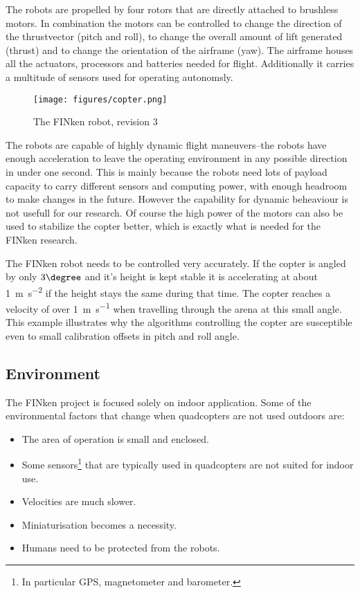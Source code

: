 The robots are propelled by four rotors that are directly attached to brushless motors.
In combination the motors can be controlled to change the direction of the thrustvector (pitch and roll), to change the overall amount of lift generated (thrust) and to change the orientation of the airframe (yaw).
The airframe houses all the actuators, processors and batteries needed for flight.
Additionally it carries a multitude of sensors used for operating autonomsly.

\begin{figure}[H]
	\centering
\texttt{[image: figures/copter.png]}
\label{copterfoto}
\caption{The FINken robot, revision 3}
\end{figure}

The robots are capable of highly dynamic flight maneuvers–the robots have enough acceleration to leave the operating environment in any possible direction in under one second.
This is mainly because the robots need lots of payload capacity to carry different sensors and computing power, with enough headroom to make changes in the future.
However the capability for dynamic beheaviour is not usefull for our research.
Of course the high power of the motors can also be used to stabilize the copter better, which is exactly what is needed for the FINken research.

The FINken robot needs to be controlled very accurately.
If the copter is angled by only $3\degree$ and it's height is kept stable it is accelerating at about \SI{1}{\metre\per\square\second} if the height stays the same during that time.
The copter reaches a velocity of over \SI{1}{\metre\per\second} when travelling through the arena at this small angle.
This example illustrates why the algorithms controlling the copter are susceptible even to small calibration offsets in pitch and roll angle.

\subsection{Environment}
\label{env}
The FINken project is focused solely on indoor application.
Some of the environmental factors that change when quadcopters are not used outdoors are:
\begin{itemize}
	\item The area of operation is small and enclosed.
	\item Some sensors\footnote{ In particular GPS, magnetometer and barometer. } that are typically used in quadcopters are not suited for indoor use.
	\item Velocities are much slower.
	\item Miniaturisation becomes a necessity.
	\item Humans need to be protected from the robots.
\end{itemize}

